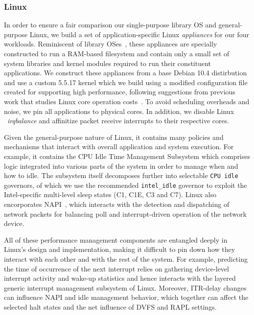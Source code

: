 \subsubsection{Linux}
\label{sec:OS_linux}
In order to ensure a fair comparison our single-purpose library OS and general-purpose Linux, we build a set of application-specific Linux \textit{appliances} for our four workloads. Reminiscent of library OSes~\cite{unikernels}, these appliances are specially constructed to run a RAM-based filesystem and contain only a small set of system libraries and kernel modules required to run their constituent applications. We construct these appliances from a base Debian 10.4 distirbution and use a custom 5.5.17 kernel which we build using a modified configuration file created for supporting high performance, following suggestions from previous work that studies Linux core operation costs~\cite{linux-core-ops}. To avoid scheduling overheads and noise, we pin all applications to physical cores. In addition, we disable Linux ~\textit{irqbalance} and affinitize packet receive interrupts to their respective cores.

Given the general-purpose nature of Linux, it contains many policies and mechanisms that interact with overall application and system execution. For example, it contains the CPU Idle Time Management Subsystem which comprises logic integrated into various parts of the system in order to manage when and how to idle. The subsystem itself decomposes further into selectable {\tt CPU idle} governors, of which we use the recommended {\tt intel\_idle} governor to exploit the Intel-specific multi-level sleep states (C1, C1E, C3 and C7). Linux also encorporates NAPI~\cite{napi}, which interacts with the detection and dispatching of network packets for balancing poll and interrupt-driven operation of the network device.


All of these performance management components are entangled deeply in Linux's design and implementation, making it difficult to pin down how they interact with each other and with the rest of the system. For example, predicting the time of occurrence of the next interrupt relies on gathering device-level interrupt activity and wake-up statistics and hence interacts with the layered generic interrupt management subsystem of Linux. Moreover, ITR-delay changes can influence NAPI and idle management behavior, which together can affect the selected halt states and the net influence of DVFS and RAPL settings.

